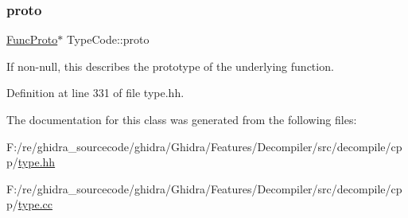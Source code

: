 \subsubsection{\texorpdfstring{proto}{proto}}
{\footnotesize\ttfamily \mbox{\hyperlink{class_func_proto}{Func\+Proto}}$\ast$ Type\+Code\+::proto\hspace{0.3cm}{\ttfamily [protected]}}



If non-\/null, this describes the prototype of the underlying function. 



Definition at line 331 of file type.\+hh.



The documentation for this class was generated from the following files\+:\begin{DoxyCompactItemize}
\item 
F\+:/re/ghidra\+\_\+sourcecode/ghidra/\+Ghidra/\+Features/\+Decompiler/src/decompile/cpp/\mbox{\hyperlink{type_8hh}{type.\+hh}}\item 
F\+:/re/ghidra\+\_\+sourcecode/ghidra/\+Ghidra/\+Features/\+Decompiler/src/decompile/cpp/\mbox{\hyperlink{type_8cc}{type.\+cc}}\end{DoxyCompactItemize}
